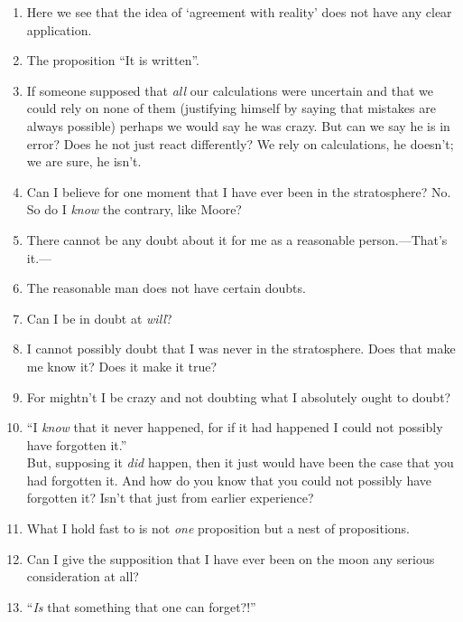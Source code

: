 \documentclass{book}
\begin{document}
\begin{enumerate}
\item
Here we see that the idea of `agreement with reality' does not have any clear
application.

\item
The proposition ``It is written''.

\item
If someone supposed that \emph{all} our calculations were uncertain and that we
could rely on none of them (justifying himself by saying that mistakes are
always possible) perhaps we would say he was crazy. But can we say he is in
error?  Does he not just react differently? We rely on calculations, he
doesn't; we are sure, he isn't.

\item
Can I believe for one moment that I have ever been in the stratosphere? No. So
do I \emph{know} the contrary, like Moore?

\item
There cannot be any doubt about it for me as a reasonable person.---That's
it.---

\item
The reasonable man does not have certain doubts.

\item
Can I be in doubt at \emph{will}?

\item
I cannot possibly doubt that I was never in the stratosphere. Does that make me
know it? Does it make it true?

\item
For mightn't I be crazy and not doubting what I absolutely ought to doubt?

\item
``I \emph{know} that it never happened, for if it had happened I could not
possibly have forgotten it.'' \\
But, supposing it \emph{did} happen, then it just would have been the case that
you had forgotten it. And how do you know that you could not possibly have
forgotten it? Isn't that just from earlier experience?

\item
What I hold fast to is not \emph{one} proposition but a nest of propositions.

\item
Can I give the supposition that I have ever been on the moon any serious
consideration at all?

\item
``\emph{Is} that something that one can forget?!''


\end{enumerate}
\end{document}
